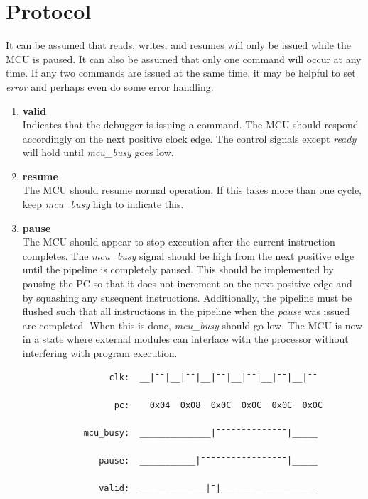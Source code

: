 \documentclass[10pt,a4paper]{article}
\begin{document}
\newpage
\section{Protocol}

It can be assumed that reads, writes, and resumes will only be issued while the MCU is paused. It
can also be assumed that only one command will occur at any time. If any two commands are issued at the
same time, it may be helpful to set \emph{error} and perhaps even do some error handling.

\begin{enumerate}

    \item\textbf{valid}\\
    Indicates that the debugger is issuing a command. The MCU should respond accordingly on the next positive clock edge.
    The control signals except \emph{ready} will hold until \emph{mcu\_busy} goes low.

    \item\textbf{resume}\\
    The MCU should resume normal operation. If this takes more than one cycle, keep \emph{mcu\_busy
    }high to indicate this.

    \item\textbf{pause}\\
    The MCU should appear to stop execution after the current instruction completes. The
    \emph{mcu\_busy} signal should be high from the next positive edge until the pipeline is
    completely paused. This should be implemented by pausing the PC so that it does not increment
    on the next positive edge and by squashing any susequent instructions. Additionally, the pipeline
    must be flushed such that all instructions in the pipeline when the \emph{pause} was
    issued are completed. When this is done, \emph{mcu\_busy} should go low. The MCU is now in a
    state where external modules can interface with the processor without interfering with
    program execution.

        \begin{verbatim}
                 clk:  __|¯¯|__|¯¯|__|¯¯|__|¯¯|__|¯¯|__|¯¯

                  pc:    0x04  0x08  0x0C  0x0C  0x0C  0x0C

            mcu_busy:  ______________|¯¯¯¯¯¯¯¯¯¯¯¯¯¯|_____

               pause:  ___________|¯¯¯¯¯¯¯¯¯¯¯¯¯¯¯¯¯|_____

               valid:  _____________|¯|___________________
        \end{verbatim}


\end{enumerate}
\end{document}
